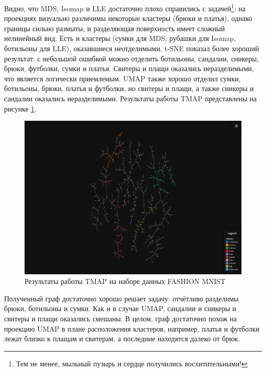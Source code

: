 \documentclass[10pt, a4paper]{extarticle}
\begin{document}
Видно, что MDS, Isomap и LLE достаточно плохо справились с задачей\footnote{Тем не менее, мыльный пузырь и сердце получились восхитительными!}: на проекциях визуально различимы некоторые кластеры (брюки и платья), однако границы сильно размыты, и разделяющая поверхность имеет сложный нелинейный вид. Есть и кластеры (сумки для MDS, рубашки для Isomap, ботильоны для LLE), оказавшиеся неотделимыми. t-SNE показал более хороший результат: с небольшой ошибкой можно отделить ботильоны, сандалии, сникеры, брюки, футболки, сумки и платья. Свитеры и плащи оказались неразделимыми, что является логически приемлемым. UMAP также хорошо отделил сумки, ботильоны, брюки, платья и футболки, но свитеры и плащи, а также сникеры и сандалии оказались неразделимыми. Результаты работы TMAP представлены на рисунке \ref{fig:tmap_fmnist}. 
 \begin{figure}[h!]
    \vspace{1em}
    \centering
    \includegraphics[width=\linewidth]{fmnist_tmap.pdf}
    \caption{Результаты работы TMAP на наборе данных FASHION MNIST}
    \label{fig:tmap_fmnist}
\end{figure}

Полученный граф достаточно хорошо решает задачу: отчётливо разделимы брюки, ботильоны и сумки. Как и в случае UMAP, сандалии и сникеры и свитеры и плащи оказались смешаны. В целом, граф достаточно похож на проекцию UMAP в плане расположения кластеров, например, платья и футболки лежат близко к плащам и свитерам, а последние находятся далеко от брюк. 
\end{document}
